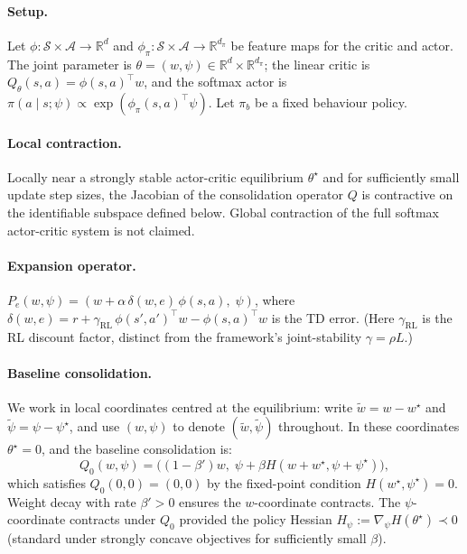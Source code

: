 \documentclass[12pt,a4paper]{article}
\newcommand{\R}{\mathbb{R}}
\begin{document}
\paragraph{Setup.}
Let $\phi : \mathcal{S} \times \mathcal{A} \to \R^d$ and
$\phi_\pi : \mathcal{S} \times \mathcal{A} \to \R^{d_\pi}$ be feature maps
for the critic and actor. The joint parameter is
$\theta = (w, \psi) \in \R^d \times \R^{d_\pi}$; the linear critic is
$Q_\theta(s,a) = \phi(s, a)^\top w$, and the softmax actor is
$\pi(a \mid s; \psi) \propto \exp(\phi_\pi(s, a)^\top \psi)$.
Let $\pi_b$ be a fixed behaviour policy.

\paragraph{Local contraction.}
Locally near a strongly stable actor-critic equilibrium $\theta^\star$ and
for sufficiently small update step sizes, the Jacobian of the consolidation
operator $Q$ is contractive on the identifiable subspace defined below.
Global contraction of the full softmax actor-critic system is not claimed.

\paragraph{Expansion operator.}
$P_e(w, \psi) = (w + \alpha\,\delta(w, e)\,\phi(s, a),\; \psi)$,
where $\delta(w, e) = r + \gamma_{\mathrm{RL}}\,\phi(s', a')^\top w -
\phi(s, a)^\top w$ is the TD error.
(Here $\gamma_{\mathrm{RL}}$ is the RL discount factor, distinct from the
framework's joint-stability $\gamma = \rho L$.)

\paragraph{Baseline consolidation.}
We work in local coordinates centred at the equilibrium: write
$\tilde w = w - w^\star$ and $\tilde\psi = \psi - \psi^\star$, and use
$(w, \psi)$ to denote $(\tilde w, \tilde\psi)$ throughout. In these
coordinates $\theta^\star = 0$, and the baseline consolidation is:
\[
  Q_0(w, \psi)
  = \bigl((1 - \beta') w,\; \psi + \beta H(w+w^\star, \psi+\psi^\star)\bigr),
\]
which satisfies $Q_0(0,0) = (0, 0)$ by the fixed-point condition
$H(w^\star, \psi^\star) = 0$. Weight decay with rate $\beta' > 0$ ensures the
$w$-coordinate contracts. The $\psi$-coordinate contracts under $Q_0$ provided
the policy Hessian $H_\psi := \nabla_\psi H(\theta^\star) \prec 0$ (standard
under strongly concave objectives for sufficiently small $\beta$).
\end{document}
